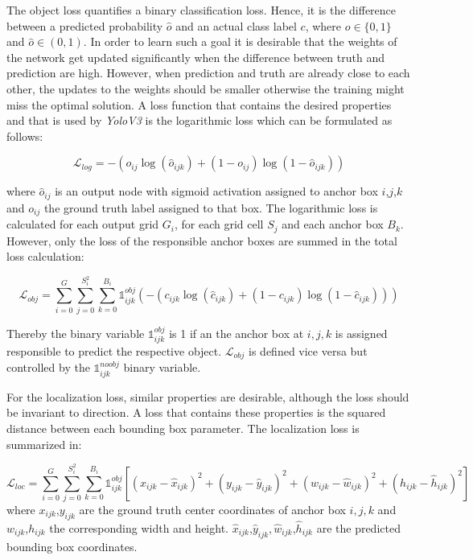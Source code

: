 The object loss quantifies a binary classification loss. Hence, it is the difference between a predicted probability $\hat o$ and an actual class label $c$, where $o \in \{0,1\}$ and $\hat o \in (0,1)$. In order to learn such a goal it is desirable that the weights of the network get updated significantly when the difference between truth and prediction are high. However, when prediction and truth are already close to each other, the updates to the weights should be smaller otherwise the training might miss the optimal solution. A loss function that contains the desired properties and that is used by \textit{YoloV3} is the logarithmic loss which can be formulated as follows:

\begin{equation}
\mathcal{L}_{log} = -(o_{ij}\log(\hat o_{ijk}) + (1 - o_{ij})\log(1 - \hat o_{ijk}))
\end{equation}

where $\hat o_{ij}$ is an output node with sigmoid activation assigned to anchor box $i$,$j$,$k$ and $ o_{ij}$ the ground truth label assigned to that box. The logarithmic loss is calculated for each output grid $G_i$, for each grid cell $S_j$ and each anchor box $B_k$. However, only the loss of the responsible anchor boxes are summed in the total loss calculation:

\begin{equation}
\mathcal{L}_{obj} = \sum_{i=0}^{G}\sum_{j=0}^{S_i^2}\sum_{k=0}^{B_i} \mathbb{1}_{ijk}^{obj}(-(c_{ijk}\log(\hat c_{ijk}) + (1 - c_{ijk})\log(1 - \hat c_{ijk})))
\end{equation}

Thereby the  binary variable $\mathbb{1}_{ijk}^{obj}$ is 1 if an the anchor box at $i,j,k$ is assigned responsible to predict the respective object. $\mathcal{L}_{obj}$ is defined vice versa but controlled by the $\mathbb{1}_{ijk}^{noobj}$ binary variable.

For the localization loss, similar properties are desirable, although the loss should be invariant to direction. A loss that contains these properties is the squared distance between each bounding box parameter. The localization loss is summarized in:

\begin{equation}
\mathcal{L}_{loc} = \sum_{i=0}^{G} \sum_{j=0}^{S_i^2}\sum_{k=0}^{B_i} \mathbb{1}_{ijk}^{obj}[(x_{ijk}-\hat{x}_{ijk})^2 + (y_{ijk}-\hat{y}_{ijk})^2  + (w_{ijk}-\hat{w}_{ijk})^2 +(h_{ijk}-\hat{h}_{ijk})^2 ]
\end{equation}
where $x_{ijk}$,$y_{ijk}$ are the ground truth center coordinates of anchor box $i,j,k$ and $w_{ijk}$,$h_{ijk}$ the corresponding width and height. $\hat x_{ijk}$,$\hat y_{ijk}, \hat w_{ijk}$,$\hat h_{ijk}$ are the predicted bounding box coordinates. 

